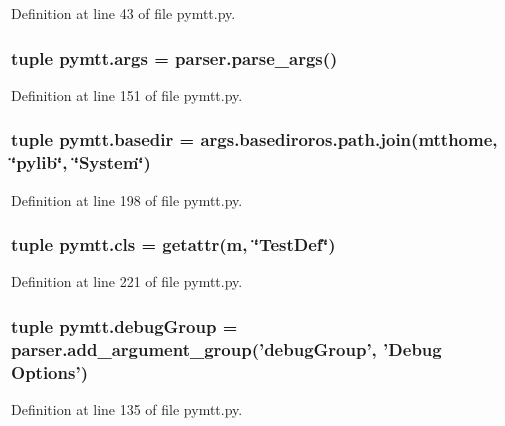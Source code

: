 Definition at line 43 of file pymtt.\-py.

\hypertarget{namespacepymtt_af7633cc372f3357c4f8e6f8dedfe7a8e}{
\subsubsection[{args}]{\setlength{\rightskip}{0pt plus 5cm}tuple pymtt.\-args = parser.\-parse\-\_\-args()}}\label{namespacepymtt_af7633cc372f3357c4f8e6f8dedfe7a8e}


Definition at line 151 of file pymtt.\-py.

\hypertarget{namespacepymtt_a57729393cfbd99464570d7fa5ad9fa05}{
\subsubsection[{basedir}]{\setlength{\rightskip}{0pt plus 5cm}tuple pymtt.\-basedir = args.\-basediroros.\-path.\-join({\bf mtthome}, \char`\"{}pylib\char`\"{}, \char`\"{}System\char`\"{})}}\label{namespacepymtt_a57729393cfbd99464570d7fa5ad9fa05}


Definition at line 198 of file pymtt.\-py.

\hypertarget{namespacepymtt_a17f658b5d141d51664bb3ede8830c4c0}{
\subsubsection[{cls}]{\setlength{\rightskip}{0pt plus 5cm}tuple pymtt.\-cls = getattr({\bf m}, \char`\"{}Test\-Def\char`\"{})}}\label{namespacepymtt_a17f658b5d141d51664bb3ede8830c4c0}


Definition at line 221 of file pymtt.\-py.

\hypertarget{namespacepymtt_af066a010075617c13a5595243ceb9041}{
\subsubsection[{debug\-Group}]{\setlength{\rightskip}{0pt plus 5cm}tuple pymtt.\-debug\-Group = parser.\-add\-\_\-argument\-\_\-group('debug\-Group', 'Debug Options')}}\label{namespacepymtt_af066a010075617c13a5595243ceb9041}


Definition at line 135 of file pymtt.\-py.

